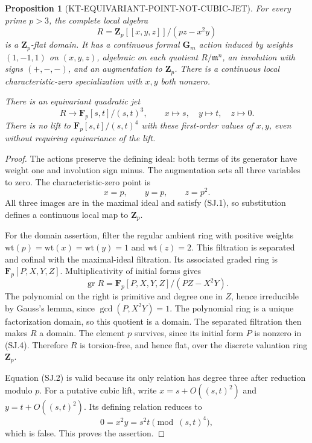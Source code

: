 \documentclass[11pt,a4paper]{article}
\newtheorem{proposition}[theorem]{Proposition}
\theoremstyle{definition}
\begin{document}
\begin{proposition}[KT-EQUIVARIANT-POINT-NOT-CUBIC-JET]
For every prime $p>3$, the complete local algebra
\[
 R=\mathbf Z_p[[x,y,z]]/(pz-x^2y)                         \tag{SJ.1}
\]
is a $\mathbf Z_p$-flat domain.  It has a continuous formal
$\mathbf G_m$ action induced by weights $(1,-1,1)$ on $(x,y,z)$,
algebraic on each quotient $R/\mathfrak m^n$,
an involution with signs $(+,-,-)$, and an augmentation to
$\mathbf Z_p$.  There is a continuous local characteristic-zero
specialization with $x,y$ both nonzero.

There is an equivariant quadratic jet
\[
 R\longrightarrow \mathbf F_p[s,t]/(s,t)^3,\qquad
             x\mapsto s,\quad y\mapsto t,\quad z\mapsto0.
                                                               \tag{SJ.2}
\]
There is no lift to $\mathbf F_p[s,t]/(s,t)^4$ with these
first-order values of $x,y$, even without requiring
equivariance of the lift.
\end{proposition}
\begin{proof}
The actions preserve the defining ideal: both terms of its
generator have weight one and involution sign minus.
The augmentation sets all three variables to zero.
The characteristic-zero point is
\[
                         x=p,\qquad y=p,\qquad z=p^2.
                                                               \tag{SJ.3}
\]
All three images are in the maximal ideal and satisfy (SJ.1),
so substitution defines a continuous local map to $\mathbf Z_p$.

For the domain assertion, filter the regular ambient ring
with positive weights
$\mathrm{wt}(p)=\mathrm{wt}(x)=\mathrm{wt}(y)=1$ and
$\mathrm{wt}(z)=2$.
This filtration is separated and cofinal with the
maximal-ideal filtration.  Its associated graded ring is
$\mathbf F_p[P,X,Y,Z]$.
Multiplicativity of initial forms gives
\[
 \operatorname{gr}R
      =\mathbf F_p[P,X,Y,Z]/(PZ-X^2Y).                  \tag{SJ.4}
\]
The polynomial on the right is primitive and degree one
in $Z$, hence irreducible by Gauss's lemma, since
$\gcd(P,X^2Y)=1$.  The polynomial ring is a unique
factorization domain, so this quotient is a domain.
The separated filtration then makes $R$ a domain.
The element $p$ survives, since its initial form $P$
is nonzero in (SJ.4).  Therefore $R$ is torsion-free,
and hence flat, over the discrete valuation ring
$\mathbf Z_p$.

Equation (SJ.2) is valid because its only relation has
degree three after reduction modulo $p$.
For a putative cubic lift, write
$x=s+O((s,t)^2)$ and $y=t+O((s,t)^2)$.
Its defining relation reduces to
\[
                      0=x^2y=s^2t\pmod{(s,t)^4},
                                                               \tag{SJ.5}
\]
which is false.  This proves the assertion.
\end{proof}
\end{document}
